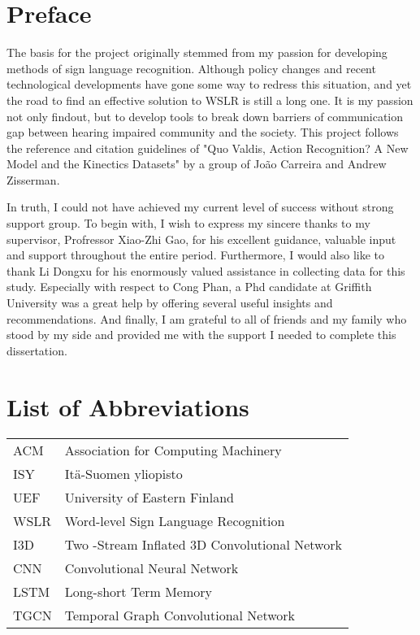 \newpage



\section*{Preface}
The basis for the project originally stemmed from my passion for developing methods of sign language recognition. Although policy changes and recent technological developments have gone some way to redress this situation, and yet the road to find an effective solution to WSLR is still a long one. It is my passion not only findout, but to develop tools to break down barriers of communication gap between hearing impaired community and the society. This project follows the reference and citation guidelines of "Quo Valdis, Action Recognition? A New Model and the Kinectics Datasets" by a group of Jo\~{a}o Carreira and Andrew Zisserman.

In truth, I could not have achieved my current level of success without strong support group. To begin with, I wish to express my sincere thanks to my supervisor, Profressor Xiao-Zhi Gao, for his excellent guidance, valuable input and support throughout the entire period. Furthermore, I would also like to thank Li Dongxu for his enormously valued assistance in collecting data for this study. Especially with respect to Cong Phan, a Phd candidate at Griffith University was a great help by offering several useful insights and recommendations. And finally, I am grateful to all of friends and my family who stood by my side and provided me with the support I needed to complete this dissertation.
\newpage


\section*{List of Abbreviations}

\begin{tabular}{lp{12.5cm}}

ACM & Association for Computing Machinery \\

ISY & Itä-Suomen yliopisto \\

UEF & University of Eastern Finland\\

WSLR & Word-level Sign Language Recognition\\

I3D & Two -Stream Inflated 3D Convolutional Network\\

CNN & Convolutional Neural Network\\

LSTM & Long-short Term Memory\\

TGCN & Temporal Graph Convolutional Network\\

\end{tabular}

\newpage




\setlength{\parskip}{0ex}

\tableofcontents
\newpage

\setlength{\parskip}{2ex}
